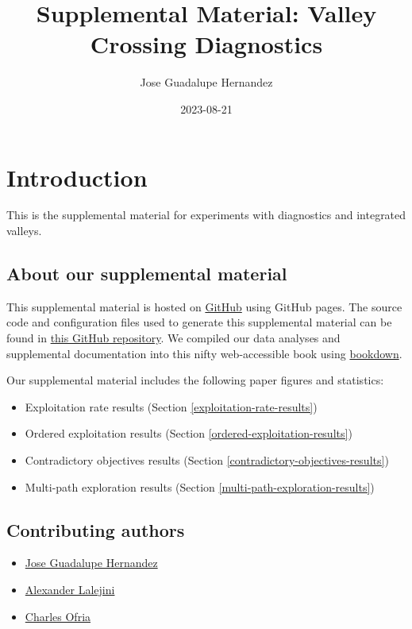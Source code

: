 \documentclass[]{book}
\title{Supplemental Material: Valley Crossing Diagnostics}
\author{Jose Guadalupe Hernandez}
\date{2023-08-21}
\providecommand{\tightlist}{%
  \setlength{\itemsep}{0pt}\setlength{\parskip}{0pt}}
\begin{document}
\maketitle

{
\setcounter{tocdepth}{1}
\tableofcontents
}
\hypertarget{introduction}{%
\chapter{Introduction}\label{introduction}}

This is the supplemental material for experiments with diagnostics and integrated valleys.

\hypertarget{about-our-supplemental-material}{%
\section{About our supplemental material}\label{about-our-supplemental-material}}

This supplemental material is hosted on \href{https://github.com}{GitHub} using GitHub pages.
The source code and configuration files used to generate this supplemental material can be found in \href{https://github.com/jgh9094/ECJ-2023-Suite-Of-Diagnostic-Metrics-For-Characterizing-Selection-Schemes}{this GitHub repository}.
We compiled our data analyses and supplemental documentation into this nifty web-accessible book using \href{https://bookdown.org/}{bookdown}.

Our supplemental material includes the following paper figures and statistics:

\begin{itemize}
\tightlist
\item
  Exploitation rate results (Section \ref{exploitation-rate-results})
\item
  Ordered exploitation results (Section \ref{ordered-exploitation-results})
\item
  Contradictory objectives results (Section \ref{contradictory-objectives-results})
\item
  Multi-path exploration results (Section \ref{multi-path-exploration-results})
\end{itemize}

\hypertarget{contributing-authors}{%
\section{Contributing authors}\label{contributing-authors}}

\begin{itemize}
\tightlist
\item
  \href{https://jgh9094.github.io/}{Jose Guadalupe Hernandez}
\item
  \href{https://lalejini.com}{Alexander Lalejini}
\item
  \href{http://ofria.com}{Charles Ofria}
\end{itemize}
\end{document}
